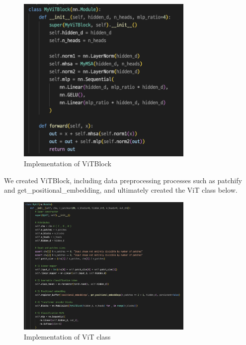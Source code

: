 \begin{figure}[h]
    \centering
    \includegraphics[width=8.5cm]{images/MyViTBlock.png}
    \caption{Implementation of ViTBlock}
    \label{fig:enter-label}
\end{figure}

We created ViTBlock, including data preprocessing processes such as patchify and get\_positional\_embedding, and ultimately created the ViT class below.

\begin{figure}[h]
    \centering
    \includegraphics[width=8.5cm]{images/MyViT.png}
    \caption{Implementation of ViT class}
    \label{fig:enter-label}
\end{figure}

